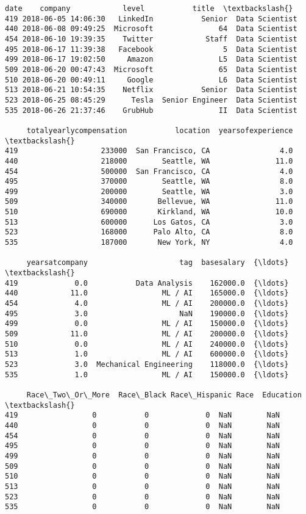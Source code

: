 \documentclass[11pt]{article}
\begin{document}
    \begin{Verbatim}[commandchars=\\\{\}]
                   date    company            level           title  \textbackslash{}
419 2018-06-05 14:06:30   LinkedIn           Senior  Data Scientist
440 2018-06-08 09:49:25  Microsoft               64  Data Scientist
454 2018-06-10 19:39:35    Twitter            Staff  Data Scientist
495 2018-06-17 11:39:38   Facebook                5  Data Scientist
499 2018-06-17 19:02:50     Amazon               L5  Data Scientist
509 2018-06-20 00:47:43  Microsoft               65  Data Scientist
510 2018-06-20 00:49:11     Google               L6  Data Scientist
513 2018-06-21 10:54:35    Netflix           Senior  Data Scientist
523 2018-06-25 08:45:29      Tesla  Senior Engineer  Data Scientist
535 2018-06-26 21:37:46    GrubHub               II  Data Scientist

     totalyearlycompensation           location  yearsofexperience  \textbackslash{}
419                   233000  San Francisco, CA                4.0
440                   218000        Seattle, WA               11.0
454                   500000  San Francisco, CA                4.0
495                   370000        Seattle, WA                8.0
499                   200000        Seattle, WA                3.0
509                   340000       Bellevue, WA               11.0
510                   690000       Kirkland, WA               10.0
513                   600000      Los Gatos, CA                3.0
523                   168000      Palo Alto, CA                8.0
535                   187000       New York, NY                4.0

     yearsatcompany                     tag  basesalary  {\ldots}  \textbackslash{}
419             0.0           Data Analysis    162000.0  {\ldots}
440            11.0                 ML / AI    165000.0  {\ldots}
454             4.0                 ML / AI    200000.0  {\ldots}
495             3.0                     NaN    190000.0  {\ldots}
499             0.0                 ML / AI    150000.0  {\ldots}
509            11.0                 ML / AI    200000.0  {\ldots}
510             0.0                 ML / AI    240000.0  {\ldots}
513             1.0                 ML / AI    600000.0  {\ldots}
523             3.0  Mechanical Engineering    118000.0  {\ldots}
535             1.0                 ML / AI    150000.0  {\ldots}

     Race\_Two\_Or\_More  Race\_Black Race\_Hispanic Race  Education  \textbackslash{}
419                 0           0             0  NaN        NaN
440                 0           0             0  NaN        NaN
454                 0           0             0  NaN        NaN
495                 0           0             0  NaN        NaN
499                 0           0             0  NaN        NaN
509                 0           0             0  NaN        NaN
510                 0           0             0  NaN        NaN
513                 0           0             0  NaN        NaN
523                 0           0             0  NaN        NaN
535                 0           0             0  NaN        NaN


\end{Verbatim}
\end{document}
